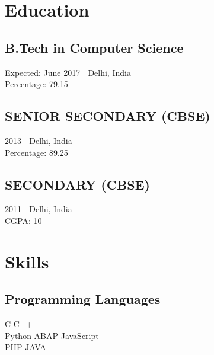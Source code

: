 \documentclass[]{resume-openfont}
\begin{document}
%
%



%
%

\begin{minipage}[t]{0.33\textwidth} 


\section{Education} 

\subsection{B.Tech in Computer Science}
Expected: June 2017 | Delhi, India \\ Percentage: 79.15
\sectionsep

\subsection{SENIOR SECONDARY (CBSE)}
2013 | Delhi, India \\ Percentage: 89.25
\sectionsep

\subsection{SECONDARY (CBSE)}
2011 | Delhi, India \\ CGPA: 10
\sectionsep


\section{Skills}
\subsection{Programming Languages}
C \textbullet{} C++ \\
Python \textbullet{} ABAP \textbullet{} JavaScript\\
PHP \textbullet{} JAVA \\
\sectionsep

\end{minipage}
\end{document}
